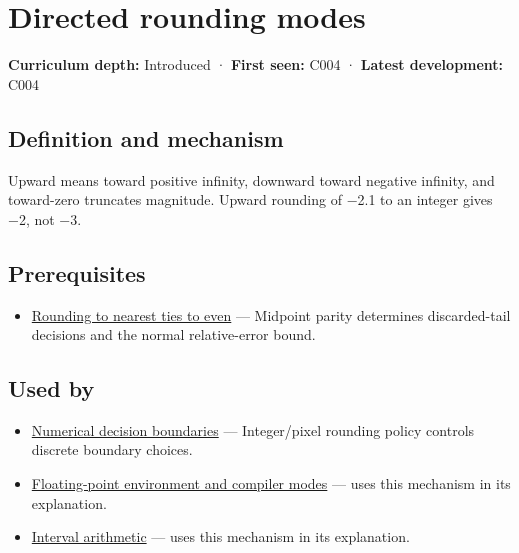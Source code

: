 \hypertarget{appendix-637d164ae5ca}{}\label{referencestart:appendix-637d164ae5ca}
\section{Directed rounding modes}\label{appendix-637d164ae5ca-directed-rounding-modes}

\textbf{Curriculum depth:} Introduced · \textbf{First seen:} C004 · \textbf{Latest development:} C004

\begin{allmightroledefinition}

\subsection{Definition and mechanism}\label{appendix-637d164ae5ca-definition-and-mechanism}

Upward means toward positive infinity, downward toward negative infinity, and toward-zero truncates magnitude. Upward rounding of −2.1 to an integer gives −2, not −3.

\end{allmightroledefinition}

\subsection{Prerequisites}\label{appendix-637d164ae5ca-prerequisites}

\begin{itemize}
\tightlist
\item
  \hyperref[appendix-614afe1de592]{Rounding to nearest ties to even} --- Midpoint parity determines discarded-tail decisions and the normal relative-error bound.
\end{itemize}

\subsection{Used by}\label{appendix-637d164ae5ca-used-by}

\begin{itemize}
\item
  \hyperref[appendix-c80db39080be]{Numerical decision boundaries} --- Integer/pixel rounding policy controls discrete boundary choices.
\item
  \hyperref[appendix-f11d1a521253]{Floating-point environment and compiler modes} --- uses this mechanism in its explanation.
\item
  \hyperref[appendix-1823a14330cb]{Interval arithmetic} --- uses this mechanism in its explanation.
\end{itemize}

